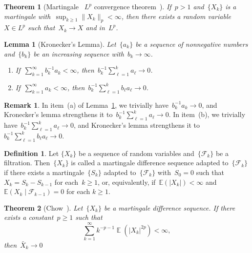 \documentclass[12pt,a4paper]{article}  %
\newcounter{cite}
\newtheorem{theorem}{Theorem}[section]
\newtheorem{lemma}{Lemma}[section]
\theoremstyle{definition}
\newtheorem{definition}{Definition}[section]
\newtheorem{remark}{Remark}[section]
\numberwithin{equation}{section}
\newcommand{\FF}{\mathcal{F}}
\newcommand{\as}{{\text{a.s.}}\xspace}
\DeclareMathOperator{\expc}{\mathbb{E}}
\begin{document}
\begin{theorem}[Martingale ~$L^p$ convergence theorem~\mbox{\cite[Theorem~4.4.6]{Durrett_2019}}] \label{th:mlp}
    If~$p> 1$ and~$\{X_k\}$ is a martingale with~$\sup_{k\ge 1} \|X_k\|_p< \infty$,
    then there exists a random variable~$X\in L^p$ such that~$X_k\to X$ \as and in~$L^p$.
\end{theorem}

\begin{lemma}[Kronecker's Lemma]
    \label{lem:kronecker}
    Let~$\{a_k\}$ be a sequence of nonnegative numbers and~$\{b_k\}$ be an increasing sequence
    with~$b_k\to \infty$.
    \begin{enumerate}
        \item If~$\sum_{k=1}^\infty b_k^{-1}a_k < \infty$, then~$b_k^{-1}\sum_{\ell=1}^k a_\ell\to 0$.
        \item If~$\sum_{k=1}^\infty a_k < \infty$, then~$b_k^{-1}\sum_{\ell=1}^k b_\ell a_\ell\to 0$.
    \end{enumerate}
\end{lemma}

\begin{remark}
    \label{rem:kronecker}
    In item~(a) of Lemma~\ref{lem:kronecker}, we trivially have~$b_k^{-1} a_k\to 0$,
    and Kronecker's lemma strengthens it to~$b_k^{-1}\sum_{\ell=1}^k a_\ell\to 0$.
    In item~(b), we trivially have~$b_k^{-1} \sum_{\ell=1}^k a_\ell\to 0$,
    and Kronecker's lemma strengthens it to~$b_k^{-1}\sum_{\ell=1}^k b_\ell a_\ell\to 0$.
\end{remark}

\begin{definition}
    \label{def:md}
    Let $\{X_k\}$ be a sequence of random variables and~$\{\FF_k\}$ be a filtration.
    Then~$\{X_k\}$ is called a martingale difference sequence
    adapted to~$\{\FF_k\}$ if there exists a martingale~$\{S_k\}$ adapted to~$\{\FF_k\}$
    with~$S_0 = 0$ such that~$X_k = S_k - S_{k-1}$ for each~$k\ge 1$, or, equivalently,
    if~$\mathbb{E}(|X_k|) < \infty$ and $\mathbb{E}(X_k \mathrel{|} \FF_{k-1}) = 0$ \as for each $k \ge 1$.
\end{definition}

\begin{theorem}[Chow~\cite{Chow_1967}]
    \label{th:sllnmd1}
    Let~$\{X_k\}$ be a martingale difference sequence. If there exists a constant~$p\ge 1$ such that
   \[
       \sum_{k=1}^\infty k^{-p-1} \expc(|X_k|^{2p}) < \infty,
   \]
   then~$\bar{X}_k \to 0$ \as
\end{theorem}
\end{document}
